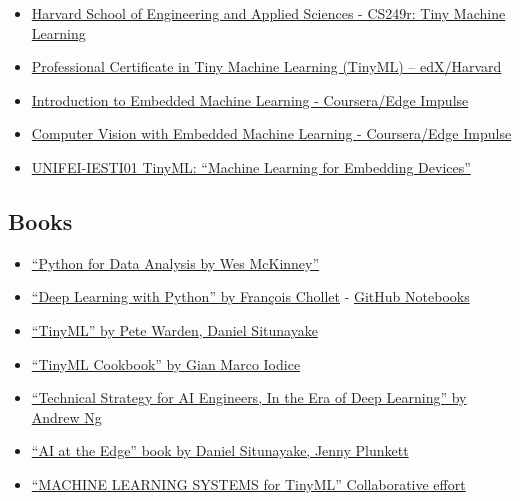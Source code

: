 \documentclass[
  letterpaper,
  DIV=11,
  numbers=noendperiod]{scrreprt}
\providecommand{\tightlist}{%
  \setlength{\itemsep}{0pt}\setlength{\parskip}{0pt}}\usepackage{longtable,booktabs,array}
\begin{document}
\begin{itemize}
\tightlist
\item
  \href{https://sites.google.com/g.harvard.edu/tinyml/home}{Harvard
  School of Engineering and Applied Sciences - CS249r: Tiny Machine
  Learning}
\item
  \href{https://www.edx.org/professional-certificate/harvardx-tiny-machine-learning}{Professional
  Certificate in Tiny Machine Learning (TinyML) -- edX/Harvard}
\item
  \href{https://www.coursera.org/learn/introduction-to-embedded-machine-learning}{Introduction
  to Embedded Machine Learning - Coursera/Edge Impulse}
\item
  \href{https://www.coursera.org/learn/computer-vision-with-embedded-machine-learning}{Computer
  Vision with Embedded Machine Learning - Coursera/Edge Impulse}
\item
  \href{https://github.com/Mjrovai/UNIFEI-IESTI01-TinyML-2023.1}{UNIFEI-IESTI01
  TinyML: ``Machine Learning for Embedding Devices''}
\end{itemize}

\hypertarget{books}{%
\subsection*{Books}\label{books}}

\begin{itemize}
\tightlist
\item
  \href{https://wesmckinney.com/book/}{``Python for Data Analysis by Wes
  McKinney''}
\item
  \href{https://www.manning.com/books/deep-learning-with-python}{``Deep
  Learning with Python'' by François Chollet} -
  \href{https://github.com/fchollet/deep-learning-with-python-notebooks}{GitHub
  Notebooks}
\item
  \href{https://www.oreilly.com/library/view/tinyml/9781492052036/}{``TinyML''
  by Pete Warden, Daniel Situnayake}
\item
  \href{https://github.com/PacktPublishing/TinyML-Cookbook}{``TinyML
  Cookbook'' by Gian Marco Iodice}
\item
  \href{https://github.com/ajaymache/machine-learning-yearning/blob/master/full\%20book/machine-learning-yearning.pdf}{``Technical
  Strategy for AI Engineers, In the Era of Deep Learning'' by Andrew Ng}
\item
  \href{https://www.oreilly.com/library/view/ai-at-the/9781098120191/}{``AI
  at the Edge'' book by Daniel Situnayake, Jenny Plunkett}
\item
  \href{https://harvard-edge.github.io/cs249r_book/}{``MACHINE LEARNING
  SYSTEMS for TinyML'' Collaborative effort}
\end{itemize}
\end{document}
